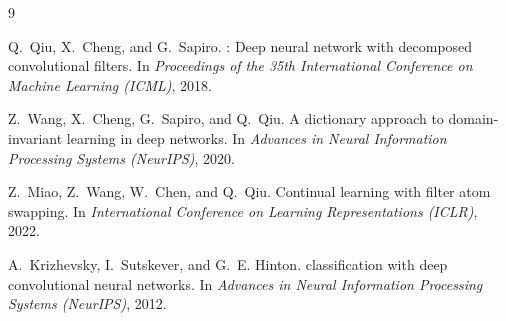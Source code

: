 \documentclass[11pt,letterpaper]{article}
\begin{document}
\begin{thebibliography}{9}

Q.~Qiu, X.~Cheng, and G.~Sapiro.
: Deep neural network with decomposed convolutional filters.
\newblock In \emph{Proceedings of the 35th International Conference on Machine
  Learning (ICML)}, 2018.

Z.~Wang, X.~Cheng, G.~Sapiro, and Q.~Qiu.
\newblock A dictionary approach to domain-invariant learning in deep networks.
\newblock In \emph{Advances in Neural Information Processing Systems
  (NeurIPS)}, 2020.

Z.~Miao, Z.~Wang, W.~Chen, and Q.~Qiu.
\newblock Continual learning with filter atom swapping.
\newblock In \emph{International Conference on Learning Representations
  (ICLR)}, 2022.

A.~Krizhevsky, I.~Sutskever, and G.~E. Hinton.
 classification with deep convolutional neural networks.
\newblock In \emph{Advances in Neural Information Processing Systems
  (NeurIPS)}, 2012.

\end{thebibliography}
\end{document}
